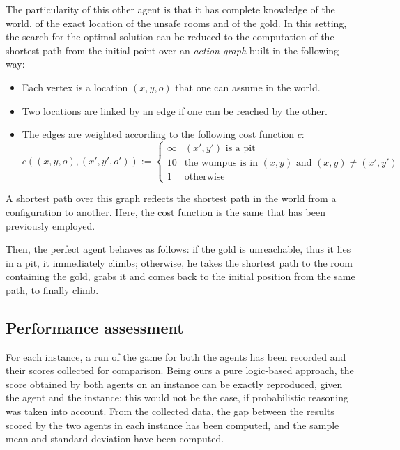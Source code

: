 \documentclass{llncs}
\begin{document}
The particularity of this other agent is that it has complete knowledge of the world, of the exact location of the unsafe rooms and of the gold.
In this setting, the search for the optimal solution can be reduced to the computation of the shortest path from the initial point over an \emph{action graph} built in the following way:
\begin{itemize}
	\item Each vertex is a location $(x,y,o)$ that one can assume in the world.
	\item Two locations are linked by an edge if one can be reached by the other.
	\item The edges are weighted according to the following cost function $c$:
	$$	
	c((x, y, o), (x', y', o')) :=
	\begin{cases} 
		\infty & (x', y') \text{ is a pit} \\
		10 & \text{the wumpus is in } (x,y) \text{ and } (x,y) \neq (x',y') \\
		1 & \text{otherwise}
	\end{cases}
	$$

\end{itemize}
A shortest path over this graph reflects the shortest path in the world from a configuration to another.
Here, the cost function is the same that has been previously employed.

Then, the perfect agent behaves as follows: if the gold is unreachable, thus it lies in a pit, it immediately climbs; otherwise, he takes the shortest path to the room containing the gold, grabs it and comes back to the initial position from the same path, to finally climb.

\subsection{Performance assessment}

For each instance, a run of the game for both the agents has been recorded and their scores collected for comparison.
Being ours a pure logic-based approach, the score obtained by both agents on an instance can be exactly reproduced, given the agent and the instance; this would not be the case, if probabilistic reasoning was taken into account.
From the collected data, the gap between the results scored by the two agents in each instance has been computed, and the sample mean and standard deviation have been computed.
\end{document}
